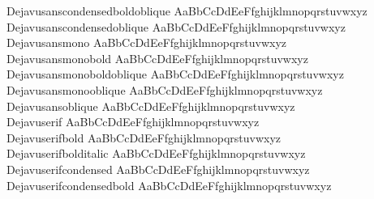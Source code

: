 \begin{tabbing}
Dejavusanscondensedboldoblique \> { AaBbCcDdEeFfghijklmnopqrstuvwxyz} \\
Dejavusanscondensedoblique \> { AaBbCcDdEeFfghijklmnopqrstuvwxyz} \\
Dejavusansmono \> { AaBbCcDdEeFfghijklmnopqrstuvwxyz} \\
Dejavusansmonobold \> { AaBbCcDdEeFfghijklmnopqrstuvwxyz} \\
Dejavusansmonoboldoblique \> { AaBbCcDdEeFfghijklmnopqrstuvwxyz} \\
Dejavusansmonooblique \> { AaBbCcDdEeFfghijklmnopqrstuvwxyz} \\
Dejavusansoblique \> { AaBbCcDdEeFfghijklmnopqrstuvwxyz} \\
Dejavuserif \> { AaBbCcDdEeFfghijklmnopqrstuvwxyz} \\
Dejavuserifbold \> { AaBbCcDdEeFfghijklmnopqrstuvwxyz} \\
Dejavuserifbolditalic \> { AaBbCcDdEeFfghijklmnopqrstuvwxyz} \\
Dejavuserifcondensed \> { AaBbCcDdEeFfghijklmnopqrstuvwxyz} \\
Dejavuserifcondensedbold \> { AaBbCcDdEeFfghijklmnopqrstuvwxyz} \\

\end{tabbing}
